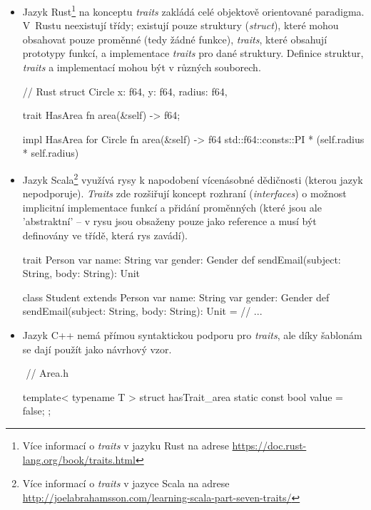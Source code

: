 \begin{itemize}
	\item Jazyk Rust\footnote{Více informací o \textit{traits} v jazyku Rust na adrese \url{https://doc.rust-lang.org/book/traits.html}} na konceptu \textit{traits} zakládá celé objektově orientované paradigma. V~Rustu neexistují třídy; existují pouze struktury (\textit{struct}), které mohou obsahovat pouze proměnné (tedy žádné funkce), \textit{traits}, které obsahují prototypy funkcí, a implementace \textit{traits} pro dané struktury. Definice struktur, \textit{traits} a implementací mohou být v různých souborech.
	\begin{rustcode}
// Rust
struct Circle {
	x: f64,
	y: f64,
	radius: f64,
}

trait HasArea {
	fn area(&self) -> f64;
}

impl HasArea for Circle {
	fn area(&self) -> f64 {
		std::f64::consts::PI * (self.radius * self.radius)
	}
}
	\end{rustcode}
	
	\item Jazyk Scala\footnote{Více informací o \textit{traits} v jazyce Scala na adrese \url{http://joelabrahamsson.com/learning-scala-part-seven-traits/}} využívá rysy k napodobení vícenásobné dědičnosti (kterou jazyk nepodporuje). \textit{Traits} zde rozšiřují koncept rozhraní (\textit{interfaces}) o možnost implicitní implementace funkcí a přidání proměnných (které jsou ale 'abstraktní' -- v rysu jsou obsaženy pouze jako reference a musí být definovány ve třídě, která rys zavádí).
	\begin{scalacode}
trait Person {
	var name: String
	var gender: Gender
	def sendEmail(subject: String, body: String): Unit
}

class Student extends Person {
	var name: String
	var gender: Gender
	def sendEmail(subject: String, body: String): Unit = {
		// ...
	}
}
	\end{scalacode}

	\item Jazyk C++ nemá přímou syntaktickou podporu pro \textit{traits}, ale díky šablonám se dají použít jako návrhový vzor.
	\begin{cppcode} $\label{traits:1}$
// Area.h		

template< typename T >
struct hasTrait_area { static const bool value = false; };


\end{cppcode}
\end{itemize}
